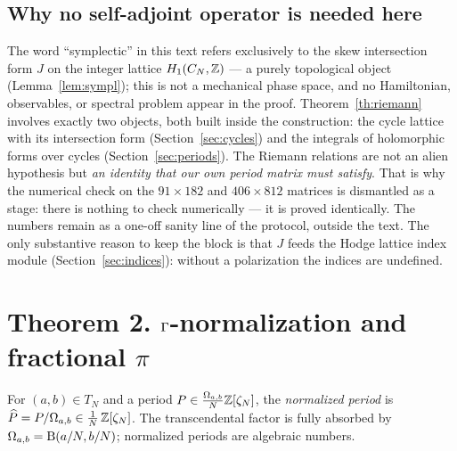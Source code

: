 \subsection{Why no self-adjoint operator is needed here}
\label{sec:nooperator}

The word ``symplectic'' in this text refers exclusively to the skew
intersection form $J$ on the integer lattice $H_1(C_N,\mathbb{Z})$ --- a
purely topological object (Lemma~\ref{lem:sympl}); this is not a
mechanical phase space, and no Hamiltonian, observables, or spectral
problem appear in the proof. Theorem~\ref{th:riemann} involves
exactly two objects, both built inside the construction: the cycle
lattice with its intersection form (Section~\ref{sec:cycles}) and
the integrals of holomorphic forms over cycles
(Section~\ref{sec:periods}). The Riemann relations are not an alien
hypothesis but \emph{an identity that our own period matrix must
satisfy}. That is why the numerical check on the $91\times182$ and
$406\times812$ matrices is dismantled as a stage: there is nothing
to check numerically --- it is proved identically. The numbers remain
as a one-off sanity line of the protocol, outside the text. The only
substantive reason to keep the block is that $J$ feeds the Hodge
lattice index module (Section~\ref{sec:indices}): without a
polarization the indices are undefined.

\section{Theorem 2. $\Gamma$-normalization and fractional $\pi$}
\label{sec:normalization}

\begin{definition}\label{def:grossnorm}
For $(a,b)\in T_N$ and a period
$P\in\frac{\Omega_{a,b}}{N}\mathbb{Z}[\zeta_N]$, the \emph{normalized
period} is
$\widehat{P} = P/\Omega_{a,b}\in\frac1N\,\mathbb{Z}[\zeta_N]$. The
transcendental factor is fully absorbed by
$\Omega_{a,b}=\mathrm{B}(a/N,b/N)$; normalized periods are algebraic
numbers.
\end{definition}

